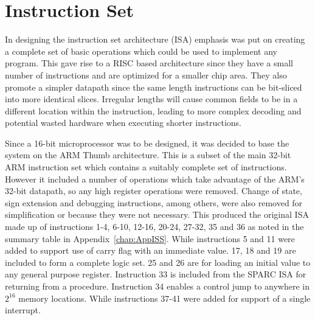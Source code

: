 
\chapter{Instruction Set}

In designing the instruction set architecture (ISA) emphasis was put on creating a complete set of basic operations which could be used to implement any program. This gave rise to a RISC based architecture since they have a small number of instructions and are optimized for a smaller chip area. They also promote a simpler datapath since the same length instructions can be bit-sliced into more identical slices. Irregular lengths will cause common fields to be in a different location within the instruction, leading to more complex decoding and potential wasted hardware when executing shorter instructions. 

Since a 16-bit microprocessor was to be designed, it was decided to base the system on the ARM Thumb architecture. This is a subset of the main 32-bit ARM instruction set which contains a suitably complete set of instructions. However it included a number of operations which take advantage of the ARM's 32-bit datapath, so any high register operations were removed. Change of state, sign extension and debugging instructions, among others, were also removed for simplification or because they were not necessary. This produced the original ISA made up of instructions 1-4, 6-10, 12-16, 20-24, 27-32, 35 and 36 as noted in the summary table in Appendix~\ref{chap:AppISS}. While instructions 5 and 11 were added to support use of carry flag with an immediate value. 17, 18 and 19 are included to form a complete logic set. 25 and 26 are for loading an initial value to any general purpose register. Instruction 33 is included from the SPARC ISA for returning from a procedure. Instruction 34 enables a control jump to anywhere in $2^{16}$ memory locations. While instructions 37-41 were added for support of a single interrupt.

